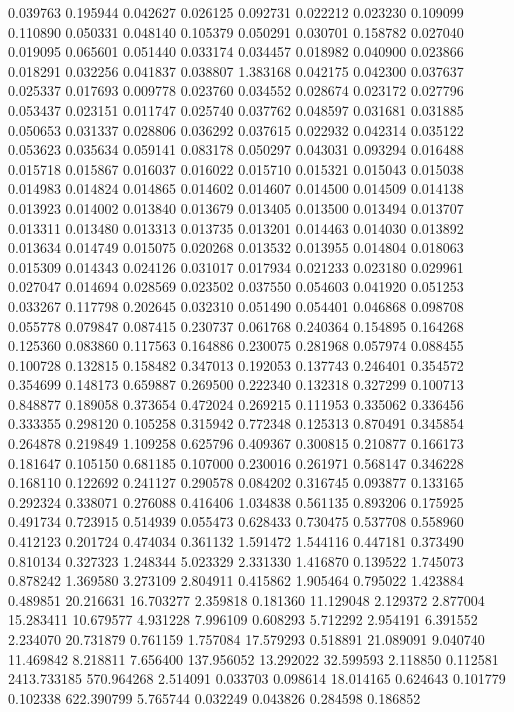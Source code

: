 0.039763
0.195944
0.042627
0.026125
0.092731
0.022212
0.023230
0.109099
0.110890
0.050331
0.048140
0.105379
0.050291
0.030701
0.158782
0.027040
0.019095
0.065601
0.051440
0.033174
0.034457
0.018982
0.040900
0.023866
0.018291
0.032256
0.041837
0.038807
1.383168
0.042175
0.042300
0.037637
0.025337
0.017693
0.009778
0.023760
0.034552
0.028674
0.023172
0.027796
0.053437
0.023151
0.011747
0.025740
0.037762
0.048597
0.031681
0.031885
0.050653
0.031337
0.028806
0.036292
0.037615
0.022932
0.042314
0.035122
0.053623
0.035634
0.059141
0.083178
0.050297
0.043031
0.093294
0.016488
0.015718
0.015867
0.016037
0.016022
0.015710
0.015321
0.015043
0.015038
0.014983
0.014824
0.014865
0.014602
0.014607
0.014500
0.014509
0.014138
0.013923
0.014002
0.013840
0.013679
0.013405
0.013500
0.013494
0.013707
0.013311
0.013480
0.013313
0.013735
0.013201
0.014463
0.014030
0.013892
0.013634
0.014749
0.015075
0.020268
0.013532
0.013955
0.014804
0.018063
0.015309
0.014343
0.024126
0.031017
0.017934
0.021233
0.023180
0.029961
0.027047
0.014694
0.028569
0.023502
0.037550
0.054603
0.041920
0.051253
0.033267
0.117798
0.202645
0.032310
0.051490
0.054401
0.046868
0.098708
0.055778
0.079847
0.087415
0.230737
0.061768
0.240364
0.154895
0.164268
0.125360
0.083860
0.117563
0.164886
0.230075
0.281968
0.057974
0.088455
0.100728
0.132815
0.158482
0.347013
0.192053
0.137743
0.246401
0.354572
0.354699
0.148173
0.659887
0.269500
0.222340
0.132318
0.327299
0.100713
0.848877
0.189058
0.373654
0.472024
0.269215
0.111953
0.335062
0.336456
0.333355
0.298120
0.105258
0.315942
0.772348
0.125313
0.870491
0.345854
0.264878
0.219849
1.109258
0.625796
0.409367
0.300815
0.210877
0.166173
0.181647
0.105150
0.681185
0.107000
0.230016
0.261971
0.568147
0.346228
0.168110
0.122692
0.241127
0.290578
0.084202
0.316745
0.093877
0.133165
0.292324
0.338071
0.276088
0.416406
1.034838
0.561135
0.893206
0.175925
0.491734
0.723915
0.514939
0.055473
0.628433
0.730475
0.537708
0.558960
0.412123
0.201724
0.474034
0.361132
1.591472
1.544116
0.447181
0.373490
0.810134
0.327323
1.248344
5.023329
2.331330
1.416870
0.139522
1.745073
0.878242
1.369580
3.273109
2.804911
0.415862
1.905464
0.795022
1.423884
0.489851
20.216631
16.703277
2.359818
0.181360
11.129048
2.129372
2.877004
15.283411
10.679577
4.931228
7.996109
0.608293
5.712292
2.954191
6.391552
2.234070
20.731879
0.761159
1.757084
17.579293
0.518891
21.089091
9.040740
11.469842
8.218811
7.656400
137.956052
13.292022
32.599593
2.118850
0.112581
2413.733185
570.964268
2.514091
0.033703
0.098614
18.014165
0.624643
0.101779
0.102338
622.390799
5.765744
0.032249
0.043826
0.284598
0.186852
